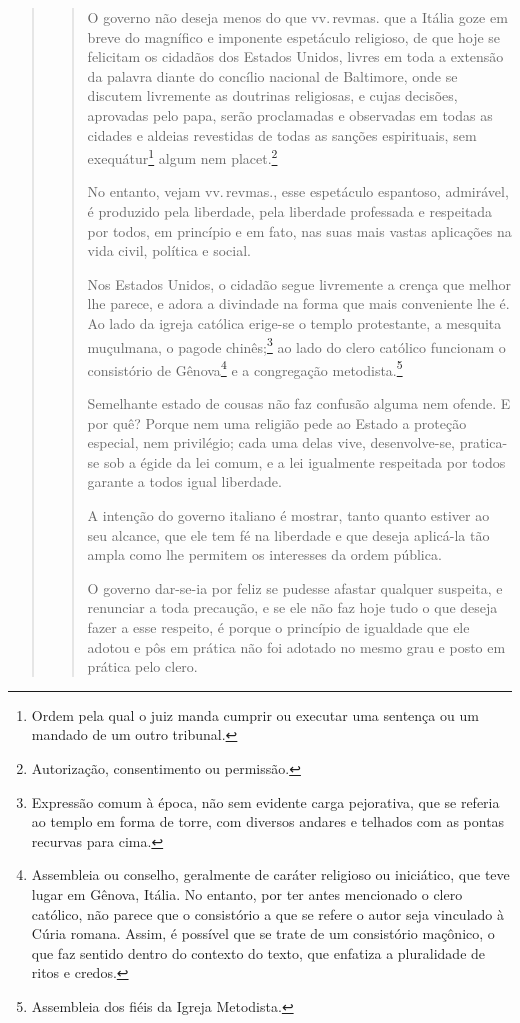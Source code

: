 \begin{quote}
\begin{quote}
O governo não deseja menos do que vv.\,revmas. que a Itália goze em breve
do magnífico e imponente espetáculo religioso, de que hoje se felicitam
os cidadãos dos Estados Unidos, livres em toda a extensão da palavra
diante do concílio nacional de Baltimore, onde se discutem livremente as
doutrinas religiosas, e cujas decisões, aprovadas pelo papa, serão
proclamadas e observadas em todas as cidades e aldeias revestidas de
todas as sanções espirituais, sem exequátur\footnote{Ordem pela qual o
  juiz manda cumprir ou executar uma sentença ou um mandado de um outro
  tribunal.} algum nem placet.\footnote{Autorização, consentimento ou
  permissão.}

No entanto, vejam vv.\,revmas., esse espetáculo espantoso, admirável, é
produzido pela liberdade, pela liberdade professada e respeitada por
todos, em princípio e em fato, nas suas mais vastas aplicações na vida
civil, política e social.

Nos Estados Unidos, o cidadão segue livremente a crença que melhor lhe
parece, e adora a divindade na forma que mais conveniente lhe é. Ao lado
da igreja católica erige-se o templo protestante, a mesquita muçulmana,
o pagode chinês;\footnote{Expressão comum à época, não sem evidente
  carga pejorativa, que se referia ao templo em forma de torre, com
  diversos andares e telhados com as pontas recurvas para cima.} ao
lado do clero católico funcionam o consistório de Gênova\footnote{
  Assembleia ou conselho, geralmente de caráter religioso ou iniciático,
  que teve lugar em Gênova, Itália. No entanto, por ter antes mencionado
  o clero católico, não parece que o consistório a que se refere o autor
  seja vinculado à Cúria romana. Assim, é possível que se trate de um
  consistório maçônico, o que faz sentido dentro do contexto do texto,
  que enfatiza a pluralidade de ritos e credos.} e a congregação
metodista.\footnote{Assembleia dos fiéis da Igreja Metodista.}

Semelhante estado de cousas não faz confusão alguma nem ofende. E por
quê? Porque nem uma religião pede ao Estado a proteção especial, nem
privilégio; cada uma delas vive, desenvolve-se, pratica-se sob a égide
da lei comum, e a lei igualmente respeitada por todos garante a todos
igual liberdade.

A intenção do governo italiano é mostrar, tanto quanto estiver ao seu
alcance, que ele tem fé na liberdade e que deseja aplicá-la tão ampla
como lhe permitem os interesses da ordem pública.

O governo dar-se-ia por feliz se pudesse afastar qualquer suspeita, e
renunciar a toda precaução, e se ele não faz hoje tudo o que deseja
fazer a esse respeito, é porque o princípio de igualdade que ele adotou
e pôs em prática não foi adotado no mesmo grau e posto em prática pelo
clero.


\end{quote}
\end{quote}
